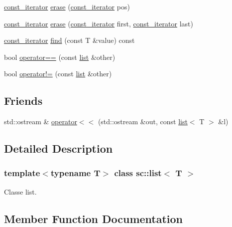 \begin{DoxyCompactItemize}
\item 
\hyperlink{classsc_1_1list_1_1const__iterator}{const\+\_\+iterator} \hyperlink{classsc_1_1list_a3ae9390d6ebdea866b9e4b934d072eac}{erase} (\hyperlink{classsc_1_1list_1_1const__iterator}{const\+\_\+iterator} pos)
\item 
\hyperlink{classsc_1_1list_1_1const__iterator}{const\+\_\+iterator} \hyperlink{classsc_1_1list_a2b2b7556fbd15d54094713647750de03}{erase} (\hyperlink{classsc_1_1list_1_1const__iterator}{const\+\_\+iterator} first, \hyperlink{classsc_1_1list_1_1const__iterator}{const\+\_\+iterator} last)
\item 
\hyperlink{classsc_1_1list_1_1const__iterator}{const\+\_\+iterator} \hyperlink{classsc_1_1list_a8709bb66990997b0602888b8d0c99860}{find} (const T \&value) const
\item 
bool \hyperlink{classsc_1_1list_a6399b703b94a2940567cf6324928fc3b}{operator==} (const \hyperlink{classsc_1_1list}{list} \&other)
\item 
bool \hyperlink{classsc_1_1list_ad7aaf392a76a163e522bf73d8868c3cf}{operator!=} (const \hyperlink{classsc_1_1list}{list} \&other)
\end{DoxyCompactItemize}
\subsection*{Friends}
\begin{DoxyCompactItemize}
\item 
std\+::ostream \& \hyperlink{classsc_1_1list_a6b15619e773f20f5e37890eaac098b78}{operator$<$$<$} (std\+::ostream \&out, const \hyperlink{classsc_1_1list}{list}$<$ T $>$ \&l)
\end{DoxyCompactItemize}


\subsection{Detailed Description}
\subsubsection*{template$<$typename T$>$\newline
class sc\+::list$<$ T $>$}

Classe list. 

\subsection{Member Function Documentation}
\mbox{\label{classsc_1_1list_a5c8aa119bd13c2a577e4ab6ba339c12e}} 
